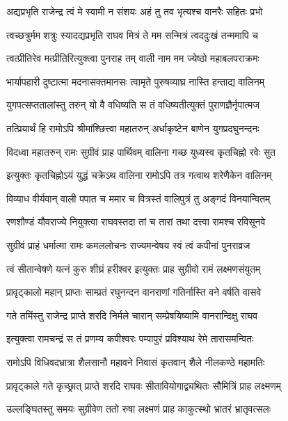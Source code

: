\twolineshloka
{अद्यप्रभृति राजेन्द्र त्वं मे स्वामी न संशयः}
{अहं तु तव भृत्यश्च वानरैः सहितः प्रभो} %

\twolineshloka
{त्वच्छत्रुर्मम शत्रुः स्यादद्यप्रभृति राघव}
{मित्रं ते मम सन्मित्रं त्वददुःखं तन्ममापि च} %

\twolineshloka
{त्वत्प्रीतिरेव मत्प्रीतिरित्युक्त्वा पुनराह तम्}
{वाली नाम मम ज्येष्ठो महाबलपराक्रमः} %

\twolineshloka
{भार्यापहारी दुष्टात्मा मदनासक्तमानसः}
{त्वामृते पुरुषव्याघ्र नास्ति हन्ताद्य वालिनम्} %

\twolineshloka
{युगपत्सप्ततालांस्तु तरुन् यो वै वधिष्यति}
{स तं वधिष्यतीत्युक्तं पुराणज्ञैर्नृपात्मज} %

\twolineshloka
{तत्प्रियार्थं हि रामोऽपि श्रीमांश्छित्त्वा महातरुन्}
{अर्धाकृष्टेन बाणेन युगप्रदघुनन्दनः} %

\twolineshloka
{विदध्वा महातरुन् रामः सुग्रीवं प्राह पार्थिवम्}
{वालिना गच्छ युध्यस्व कृतचिह्नो रवेः सुत} %

\twolineshloka
{इत्युक्तः कृतचिह्नोऽयं युद्धं चक्रेऽथ वालिना}
{रामोऽपि तत्र गत्वाथ शरेणैकेन वालिनम्} %

\twolineshloka
{विव्याध वीर्यवान् वाली पपात च ममार च}
{वित्रस्तं वालिपुत्रं तु अङ्गदं विनयान्वितम्} %

\twolineshloka
{रणशौण्डं यौवराज्ये नियुक्त्वा राघवस्तदा}
{तां च तारां तथा दत्त्वा रामश्च रविसूनवे} %

\twolineshloka
{सुग्रीवं प्राहं धर्मात्मा रामः कमललोचनः}
{राज्यमन्वेषय स्वं त्वं कपीनां पुनराव्रज} %

\twolineshloka
{त्वं सीतान्वेषणे यत्नं कुरु शीघ्रं हरीश्वर}
{इत्युक्तः प्राह सुग्रीवो रामं लक्ष्मणसंयुतम्} %

\twolineshloka
{प्रावृट्कालो महान् प्राप्तः साम्प्रतं रघुनन्दन}
{वानराणां गतिर्नास्ति वने वर्षति वासवे} %

\twolineshloka
{गते तमिंस्तु राजेन्द्र प्राप्ते शरदि निर्मले}
{चारान् सम्प्रेषयिष्यामि वानरान्दिक्षु राघव} %

\twolineshloka
{इत्युक्त्वा रामचन्द्रं स तं प्रणम्य कपीश्वरः}
{पम्पापुरं प्रविश्याथ रेमे तारासमन्वितः} %

\twolineshloka
{रामोऽपि विधिवदभ्रात्रा शैलसानौ महावने}
{निवासं कृतवान् शैले नीलकण्ठे महामतिः} %

\twolineshloka
{प्रावृट्काले गते कृच्छ्रात् प्राप्ते शरदि राघवः}
{सीतावियोगाद्व्यथितः सौमित्रिं प्राह लक्ष्मणम्} %

\twolineshloka
{उल्लङ्घितस्तु समयः सुग्रीवेण ततो रुषा}
{लक्ष्मणं प्राह काकुत्स्थो भ्रातरं भ्रातृवत्सलः} %

